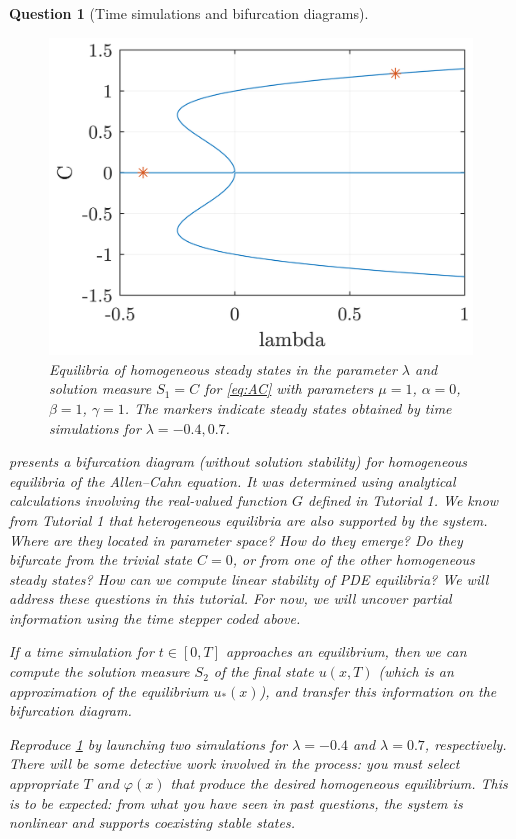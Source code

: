 \documentclass[a4paper]{siamart220329}
\theoremstyle{plain}
\newtheorem{question}{Question}
\begin{document}
\begin{question}[Time simulations and bifurcation diagrams]
\begin{figure}[t!]
  \centering
  \includegraphics{bd_hom}
  \caption{Equilibria of homogeneous steady states in the parameter
  $\lambda$ and solution measure $S_1 = C$ for \cref{eq:AC} with parameters $\mu = 1$,
$\alpha=0$, $\beta=1$, $\gamma =1$. The markers indicate steady states obtained by
time simulations for $\lambda = -0.4, 0.7$.}
  \label{fig:bd}
\end{figure}
%
 presents a bifurcation diagram (without solution stability) for
homogeneous equilibria of the Allen--Cahn equation. It was determined using
analytical calculations involving the real-valued function $G$ defined in Tutorial 1.
We know from Tutorial 1 that heterogeneous equilibria are also supported by the
system. Where are they located in parameter space? How do they emerge? Do they
bifurcate from the trivial state $C=0$, or from one of the other homogeneous steady
states? How can we compute linear stability of PDE equilibria? We will address these
questions in this tutorial. For now, we will uncover partial information using the
time stepper coded above.

If a time simulation for $t \in [0,T]$ approaches an equilibrium, then we can compute
the solution measure $S_2$ of the final state $u(x,T)$ (which is an approximation of
the equilibrium $u_*(x)$), and transfer this information on the bifurcation diagram.

Reproduce \cref{fig:bd} by launching two simulations for $\lambda = -0.4$ and
$\lambda = 0.7$, respectively. There will be some detective work involved in the
process: you must select appropriate $T$ and $\varphi(x)$ that produce the desired
homogeneous equilibrium. This is to be expected: from what you have seen in past
questions, the system is nonlinear and supports coexisting stable states.
\end{question}
\end{document}
